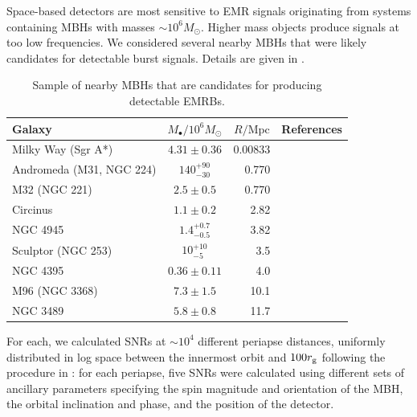 Space-based detectors are most sensitive to EMR signals originating from systems containing MBHs with masses $\sim10^6 M_\odot$. Higher mass objects produce signals at too low frequencies. We considered several nearby MBHs that were likely candidates for detectable burst signals. Details are given in .
\begin{table}\footnotesize
 \centering
  \begin{tabular}{P{0.22\textwidth} c  D{.}{.}{2.5} P{0.4\textwidth}}
  \toprule
   Galaxy &  &  & References \\
 \midrule
 Milky Way (Sgr A*) & $4.31 \pm 0.36$ & 0.00833 & \citet{Gillessen2009} \\
 Andromeda (M31, NGC 224) & $140^{+90}_{-30}$ & 0.770 & \citet{Bender2005,Karachentsev2004} \\
 M32 (NGC 221) & $2.5 \pm 0.5$ & 0.770 & \citet{Verolme2002,Karachentsev2004} \\
 Circinus & $1.1 \pm 0.2$ & 2.82 & \citet{Graham2008,Greenhill2003,Karachentsev2007} \\
 NGC 4945 & $1.4^{+0.7}_{-0.5}$ & 3.82 & \citet{Greenhill1997,Ferrarese2005,Karachentsev2007} \\
 Sculptor (NGC 253) & $10^{+10}_{-5}$ & 3.5 & \citet{Graham2011,Rodriguez-Rico2006,Rekola2005} \\
 NGC 4395 & $0.36 \pm 0.11$ & 4.0 & \citet{Peterson2005,Thim2004} \\
 M96 (NGC 3368) & $7.3 \pm 1.5$ & 10.1 & \citet{Graham2011,Nowak2010,Tonry2001} \\
 NGC 3489 & $5.8 \pm 0.8$ & 11.7 & \citet{Graham2011,Nowak2010,Tonry2001} \\
\bottomrule
\end{tabular}
\caption{Sample of nearby MBHs that are candidates for producing detectable EMRBs.\label{tab:MBHs}}
\end{table}
For each, we calculated SNRs at $\sim 10^4$ different periapse distances, uniformly distributed in log space between the innermost orbit and $100 r_\mathrm{g}$ following the procedure in : for each periapse, five SNRs were calculated using different sets of ancillary parameters specifying the spin magnitude and orientation of the MBH, the orbital inclination and phase, and the position of the detector.

